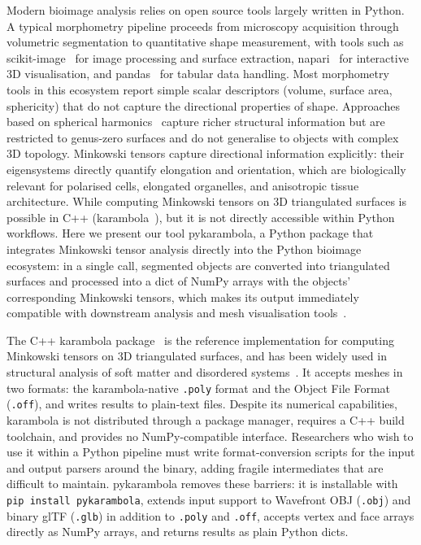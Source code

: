 \documentclass[times, twoside, watermark]{zHenriquesLab-StyleBioRxiv}
\begin{document}
Modern bioimage analysis relies on open source tools largely written in Python.
A typical morphometry pipeline proceeds from microscopy acquisition through volumetric segmentation to quantitative shape measurement, with tools such as scikit-image~\cite{vanderwalt2014scikit} for image processing and surface extraction, napari~\cite{Sofroniew2026napari} for interactive 3D visualisation, and pandas~\cite{McKinney2010pandas} for tabular data handling.
Most morphometry tools in this ecosystem report simple scalar descriptors (volume, surface area, sphericity) that do not capture the directional properties of shape.
Approaches based on spherical harmonics~\cite{ruan2019evaluation, viana2023integrated} capture richer structural information but are restricted to genus-zero surfaces and do not generalise to objects with complex 3D topology.
Minkowski tensors capture directional information explicitly: their eigensystems directly quantify elongation and orientation, which are biologically relevant for polarised cells, elongated organelles, and anisotropic tissue architecture.
While computing Minkowski tensors on 3D triangulated surfaces is possible in C++ (karambola~\cite{Schaller2020karambola}), but it is not directly accessible within Python workflows.
Here we present our tool pykarambola, a Python package that integrates Minkowski tensor analysis directly into the Python bioimage ecosystem: in a single call, segmented objects are converted into triangulated surfaces and processed into a dict of NumPy arrays with the objects' corresponding Minkowski tensors, which makes its output immediately compatible with downstream analysis and mesh visualisation tools~\cite{Sofroniew2026napari, Sullivan2019pyvista, Musy2026vedo}.

The C++ karambola package~\cite{Schaller2020karambola} is the reference implementation for computing Minkowski tensors on 3D triangulated surfaces, and has been widely used in structural analysis of soft matter and disordered systems~\cite{SchroderTurk2013}.
It accepts meshes in two formats: the karambola-native \texttt{.poly} format and the Object File Format (\texttt{.off}), and writes results to plain-text files.
Despite its numerical capabilities, karambola is not distributed through a package manager, requires a C++ build toolchain, and provides no NumPy-compatible interface.
Researchers who wish to use it within a Python pipeline must write format-conversion scripts for the input and output parsers around the binary, adding fragile intermediates that are difficult to maintain.
pykarambola removes these barriers: it is installable with \texttt{pip install pykarambola}, extends input support to Wavefront OBJ (\texttt{.obj}) and binary glTF (\texttt{.glb}) in addition to \texttt{.poly} and \texttt{.off}, accepts vertex and face arrays directly as NumPy arrays, and returns results as plain Python dicts.
\end{document}
